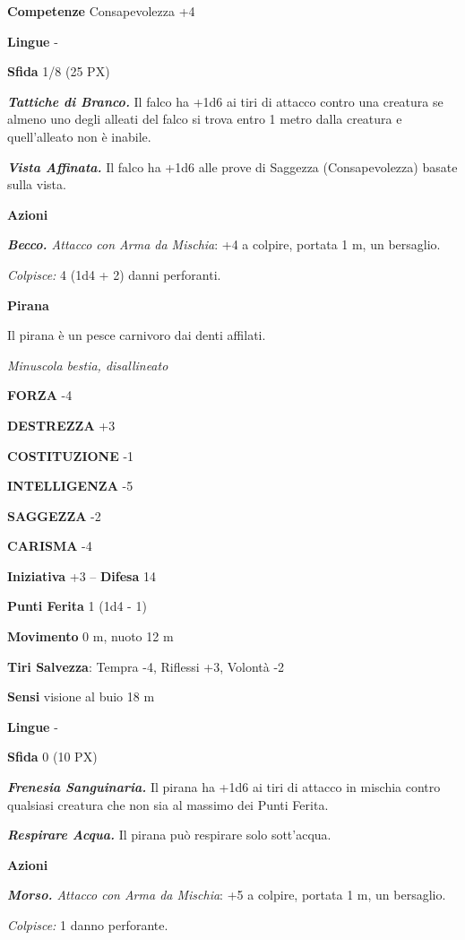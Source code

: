 \begin{multicols}{2}
\textbf{Competenze} Consapevolezza +4

\textbf{Lingue} -

\textbf{Sfida} 1/8 (25 PX)

\textit{\textbf{Tattiche di Branco.}} Il falco ha +1d6 ai tiri di attacco contro una creatura se almeno uno degli alleati del falco si trova entro 1 metro dalla creatura e quell'alleato non è inabile.

\textit{\textbf{Vista Affinata.}} Il falco ha +1d6 alle prove di Saggezza (Consapevolezza) basate sulla vista.

\textbf{Azioni}

\textit{\textbf{Becco.} Attacco con Arma da Mischia}: +4 a colpire, portata 1 m, un bersaglio.

\textit{Colpisce:} 4 (1d4 + 2) danni perforanti.

\medskip\textbf{Pirana}

Il pirana è un pesce carnivoro dai denti affilati.

\textit{Minuscola bestia, disallineato}

\textbf{FORZA} -4

\textbf{DESTREZZA} +3

\textbf{COSTITUZIONE} -1

\textbf{INTELLIGENZA} -5

\textbf{SAGGEZZA} -2

\textbf{CARISMA} -4

\textbf{Iniziativa} +3 -- \textbf{Difesa} 14

\textbf{Punti Ferita} 1 (1d4 - 1)

\textbf{Movimento} 0 m, nuoto 12 m

\textbf{Tiri Salvezza}: Tempra -4, Riflessi +3, Volontà -2

\textbf{Sensi} visione al buio 18 m

\textbf{Lingue} -

\textbf{Sfida} 0 (10 PX)

\textit{\textbf{Frenesia Sanguinaria.}} Il pirana ha +1d6 ai tiri di attacco in mischia contro qualsiasi creatura che non sia al massimo dei Punti Ferita.

\textit{\textbf{Respirare Acqua.}} Il pirana può respirare solo sott'acqua.

\textbf{Azioni}

\textit{\textbf{Morso.} Attacco con Arma da Mischia}: +5 a colpire, portata 1 m, un bersaglio.

\textit{Colpisce:} 1 danno perforante.


\end{multicols}
